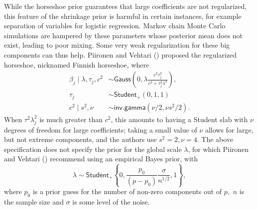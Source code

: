 \documentclass[
  11pt,
  letterpaper,
]{scrbook}
\theoremstyle{definition}
\theoremstyle{definition}
\theoremstyle{definition}
\theoremstyle{plain}
\theoremstyle{plain}
\theoremstyle{plain}
\theoremstyle{remark}
\begin{document}
While the horseshoe prior guarantees that large coefficients are not
regularized, this feature of the shrinkage prior is harmful in certain
instances, for example separation of variables for logistic regression.
Markov chain Monte Carlo simulations are hampered by these parameters
whose posterior mean does not exist, leading to poor mixing. Some very
weak regularization for these big components can thus help. Piironen and
Vehtari () proposed the
regularized horseshoe, nicknamed Finnish horseshoe, where \begin{align*}
\beta_j \mid \lambda, \tau_j, c^2 &\sim \mathsf{Gauss}\left(0, \lambda\frac{c^2\tau_j^2}{c^2 + \tau^2_j\lambda^2}\right), \\
\tau_j &\sim \mathsf{Student}_{+}(0, 1, 1)\\
c^2 \mid s^2, \nu &\sim \mathsf{inv. gamma}(\nu/2, \nu s^2/2).
\end{align*} When \(\tau^2\lambda^2_j\) is much greater than \(c^2\),
this amounts to having a Student slab with \(\nu\) degrees of freedom
for large coefficients; taking a small value of \(\nu\) allows for
large, but not extreme components, and the authors use \(s^2=2, \nu=4.\)
The above specification does not specify the prior for the global scale
\(\lambda\), for which Piironen and Vehtari
() recommend using an
empirical Bayes prior, with
\[\lambda \sim \mathsf{Student}_{+}\left\{0, \frac{p_0}{(p-p_0)}\frac{\sigma}{n^{1/2}}, 1\right\},\]
where \(p_0\) is a prior guess for the number of non-zero components out
of \(p,\) \(n\) is the sample size and \(\sigma\) is some level of the
noise.
\end{document}
